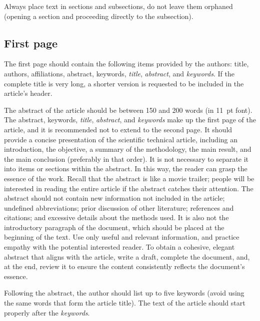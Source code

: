 Always place text in sections and subsections, do not leave them orphaned (opening a section and proceeding directly to the subsection).

\subsection{First page}

The first page should contain the following items provided by the authors: title, authors, affiliations, abstract, keywords, \textit{title}, \textit{abstract}, and \textit{keywords}. 
%
If the complete title is very long, a shorter version is requested to be included in the article's header.

The abstract of the article should be between 150 and 200 words (in 11~pt font). The abstract, keywords, \textit{title}, \textit{abstract}, and \textit{keywords} make up the first page of the article, and it is recommended not to extend to the second page. 
It should provide a concise presentation of the scientific technical article, including an introduction, the objective, a summary of the methodology, the main result, and the main conclusion (preferably in that order). It is not necessary to separate it into items or sections within the abstract. In this way, the reader can grasp the essence of the work. Recall that the abstract is like a movie trailer; people will be interested in reading the entire article if the abstract catches their attention. The abstract should not contain new information not included in the article; undefined abbreviations; prior discussion of other literature; references and citations; and excessive details about the methods used. It is also not the introductory paragraph of the document, which should be placed at the beginning of the text. Use only useful and relevant information, and practice empathy with the potential interested reader. To obtain a cohesive, elegant abstract that aligns with the article, write a draft, complete the document, and, at the end, review it to ensure the content consistently reflects the document's essence. 

Following the abstract, the author should list up to five keywords (avoid using the same words that form the article title). The text of the article should start properly after the \textit{keywords}.

